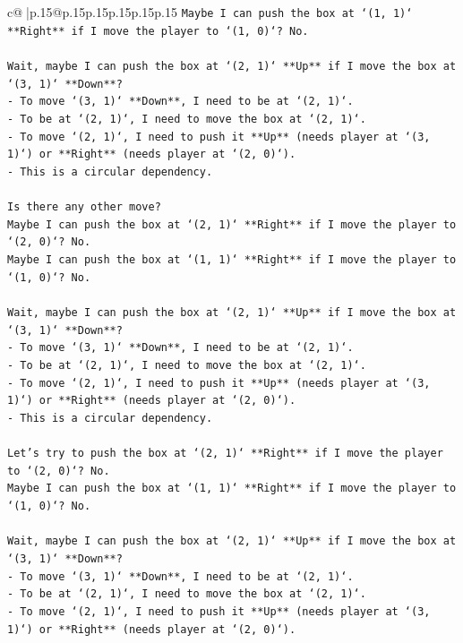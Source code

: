 \documentclass{article}
\begin{document}
{\begin{supertabular}{c@{$\;$}|p{.15\linewidth}@{}p{.15\linewidth}p{.15\linewidth}p{.15\linewidth}p{.15\linewidth}p{.15\linewidth}}
{{{\texttt{Maybe I can push the box at `(1, 1)` **Right** if I move the player to `(1, 0)`? No.} \\
\\ 
\texttt{Wait, maybe I can push the box at `(2, 1)` **Up** if I move the box at `(3, 1)` **Down**?} \\
\texttt{{-} To move `(3, 1)` **Down**, I need to be at `(2, 1)`.} \\
\texttt{{-} To be at `(2, 1)`, I need to move the box at `(2, 1)`.} \\
\texttt{{-} To move `(2, 1)`, I need to push it **Up** (needs player at `(3, 1)`) or **Right** (needs player at `(2, 0)`).} \\
\texttt{{-} This is a circular dependency.} \\
\\ 
\texttt{Is there any other move?} \\
\texttt{Maybe I can push the box at `(2, 1)` **Right** if I move the player to `(2, 0)`? No.} \\
\texttt{Maybe I can push the box at `(1, 1)` **Right** if I move the player to `(1, 0)`? No.} \\
\\ 
\texttt{Wait, maybe I can push the box at `(2, 1)` **Up** if I move the box at `(3, 1)` **Down**?} \\
\texttt{{-} To move `(3, 1)` **Down**, I need to be at `(2, 1)`.} \\
\texttt{{-} To be at `(2, 1)`, I need to move the box at `(2, 1)`.} \\
\texttt{{-} To move `(2, 1)`, I need to push it **Up** (needs player at `(3, 1)`) or **Right** (needs player at `(2, 0)`).} \\
\texttt{{-} This is a circular dependency.} \\
\\ 
\texttt{Let's try to push the box at `(2, 1)` **Right** if I move the player to `(2, 0)`? No.} \\
\texttt{Maybe I can push the box at `(1, 1)` **Right** if I move the player to `(1, 0)`? No.} \\
\\ 
\texttt{Wait, maybe I can push the box at `(2, 1)` **Up** if I move the box at `(3, 1)` **Down**?} \\
\texttt{{-} To move `(3, 1)` **Down**, I need to be at `(2, 1)`.} \\
\texttt{{-} To be at `(2, 1)`, I need to move the box at `(2, 1)`.} \\
\texttt{{-} To move `(2, 1)`, I need to push it **Up** (needs player at `(3, 1)`) or **Right** (needs player at `(2, 0)`).} \\
}}}
\end{supertabular}}
\end{document}
